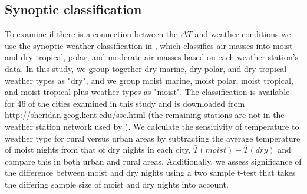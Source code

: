 {%
\subsection{Synoptic classification}
To examine if there is a connection between the  $\Delta T$ and weather conditions we use the synoptic weather classification in \cite{sheridan2002redevelopment}, which 
classifies air masses into moist and dry tropical, polar, and moderate air masses based on each weather station's data. In this study, we group together dry marine, dry polar, and dry tropical weather types as "dry", and we group moist marine, moist polar, moist tropical, and moist tropical plus weather types as "moist". The classification is available for 46 of the cities examined in this study and is downloaded from http://sheridan.geog.kent.edu/ssc.html (the remaining stations are not in the weather station network used by \cite{sheridan2002redevelopment}). We calculate the sensitivity of temperature to weather type for rural versus urban areas 
by subtracting the average temperature of moist nights from that of dry nights in each city, $\overline{T}( {moist})  -  \overline{T}( {dry} ) $ and compare this in both urban and rural areas. Additionally, we assess significance of the difference between moist and dry nights using a two sample t-test that takes the differing sample size of moist and dry nights into account. 
 

}
